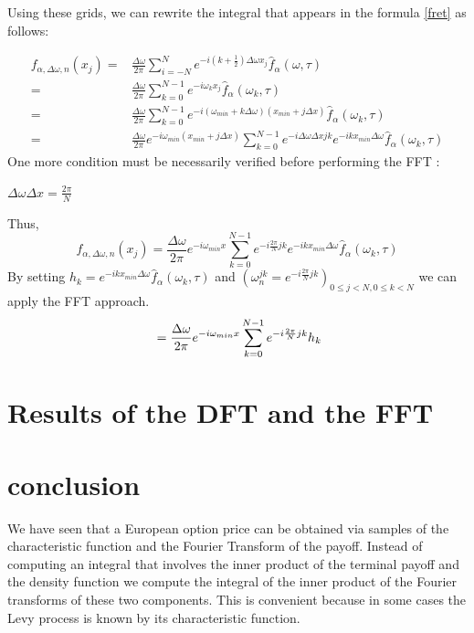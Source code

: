 \documentclass[12pt]{report}
\begin{document}
Using these grids, we can rewrite the integral that appears in the formula \eqref{fret} as follows:

\begin{align}
f_{\alpha,\Delta \omega, n}(x_j)=&\frac{\Delta \omega}{2\pi} \sum \limits_{i=-N}^N e^{-i(k+\frac{1}{2} ) \Delta \omega x_j }\hat{f}_{\alpha}(\omega,\tau) \nonumber
\\=& \frac{\Delta \omega}{2\pi} \sum \limits_{k=0}^{N-1} e^{-i \omega_k x_j }\hat{f}_{\alpha}(\omega_k,\tau) \nonumber
\\=& \frac{\Delta \omega}{2\pi} \sum \limits_{k=0}^{N-1} e^{-i (\omega_{min}+k\Delta \omega )  (x_{min}+j\Delta x) }\hat{f}_{\alpha}(\omega_k,\tau) \nonumber
\\=&\frac{\Delta \omega}{2\pi}
\label{fret}e^{-i \omega_{min} (x_{min}+j\Delta x) } \sum \limits_{k=0}^{N-1} e^{-i\Delta \omega \Delta x j k} e^{-i k x_{min} \Delta \omega}\hat{f}_{\alpha}(\omega_k,\tau) \nonumber
\end{align}
One more condition must be necessarily verified before performing the FFT :
\begin{center}
$\Delta \omega \Delta x = \frac{2 \pi}{N}$
\end{center} 
Thus, \\
\begin{equation*}
f_{\alpha,\Delta \omega, n}(x_j)=\frac{\Delta \omega}{2\pi} e^{-i \omega_{min} x} \sum \limits_{k=0}^{N-1} e^{-i\frac{2 \pi}{N}j k} e^{-i k x_{min} \Delta \omega}\hat{f}_{\alpha}(\omega_k,\tau) 
\end{equation*}
By setting $h_k=  e^{-i k x_{min} \Delta \omega } \hat{f}_{\alpha}(\omega_k,\tau)$ and $(\omega_n^{j k}= e^{-i \frac{2\pi}{N}j k })_{0 \le j<N , 0 \le k<N}$ we can apply the FFT approach.
\begin{equation}
\\=\frac{\Delta \omega}{2\pi} e^{-i \omega_{min} x} \sum \limits_{k=0}^{N-1} e^{-i\frac{2 \pi}{N}j k} h_k
\label{4.14}
\end{equation}

\section{Results of the DFT and the FFT}
\section{conclusion }
We have seen that a European option price can be obtained via samples of the characteristic function and the Fourier Transform of the payoff. Instead of computing an integral that involves the inner product of the terminal payoff and the density function we compute the integral of the inner product of the  Fourier transforms of these two components. This is convenient because in some cases the Levy process is known by its characteristic function.
\end{document}
